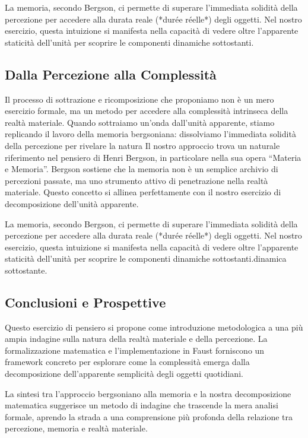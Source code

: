 \documentclass[a4paper,11pt]{article}
\begin{document}
La memoria, secondo Bergson, ci permette di superare l'immediata
solidità della percezione per accedere alla durata reale (*durée
réelle*) degli oggetti. Nel nostro esercizio, questa intuizione si
manifesta nella capacità di vedere oltre l'apparente staticità
dell'unità per scoprire le componenti dinamiche sottostanti.

\subsection{Dalla Percezione alla Complessità}

Il processo di sottrazione e ricomposizione che proponiamo non è un mero
esercizio formale, ma un metodo per accedere alla complessità intrinseca
della realtà materiale. Quando sottraiamo un'onda dall'unità apparente,
stiamo replicando il lavoro della memoria bergsoniana: dissolviamo
l'immediata solidità della percezione per rivelare la natura Il nostro approccio trova un naturale riferimento nel pensiero di Henri
Bergson, in particolare nella sua opera “Materia e Memoria”. Bergson
sostiene che la memoria non è un semplice archivio di percezioni
passate, ma uno strumento attivo di penetrazione nella realtà materiale.
Questo concetto si allinea perfettamente con il nostro esercizio di
decomposizione dell'unità apparente.

La memoria, secondo Bergson, ci permette di superare l'immediata
solidità della percezione per accedere alla durata reale (*durée
réelle*) degli oggetti. Nel nostro esercizio, questa intuizione si
manifesta nella capacità di vedere oltre l'apparente staticità
dell'unità per scoprire le componenti dinamiche sottostanti.dinamica
sottostante.

\subsection{Conclusioni e Prospettive}

Questo esercizio di pensiero si propone come introduzione metodologica a
una più ampia indagine sulla natura della realtà materiale e della
percezione. La formalizzazione matematica e l'implementazione in Faust
forniscono un framework concreto per esplorare come la complessità
emerga dalla decomposizione dell'apparente semplicità degli oggetti
quotidiani.

La sintesi tra l'approccio bergsoniano alla memoria e la nostra
decomposizione matematica suggerisce un metodo di indagine che trascende
la mera analisi formale, aprendo la strada a una comprensione più
profonda della relazione tra percezione, memoria e realtà materiale.
\end{document}
